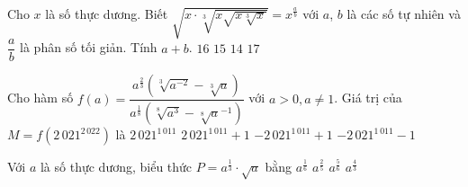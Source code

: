 \begin{ex}%
	Cho $x$ là số thực dương. Biết $\sqrt{x\cdot \sqrt[3]{x\sqrt{x\sqrt[3]{x}}}} = x^{\tfrac{a}{b}}$ với $a$, $b$ là các số tự nhiên và $\dfrac{a}{b}$  là phân số tối giản. Tính $a+b$.
	 \choice
		{\True  $16$}
		{$15$} 
		{$14$} 
		 {$17$}
\end{ex}

\begin{ex}%
	Cho  hàm số $f\left(a\right)=\dfrac{a^{\tfrac{2}{3}}\left(\sqrt[3]{a^{-2}}-\sqrt[3]{a}\right)}{a^{\tfrac{1}{8}}\left(\sqrt[8]{a^{3}}-\sqrt[8]a^{-1}\right)}$ với $a>0,a\ne 1$. Giá trị của $M=f\left(2\,021^{2\,022}\right)$ là
	 \choice
		{$2\,021^{1\,011}$} 
		{$2\,021^{1\,011}+1$} 
		 {$-2\,021^{1\,011}+1$}
		 {\True $-2\,021^{1\,011}-1$}
\end{ex}

\begin{ex}%
	Với $a$ là số thực dương,  biểu thức $P=a^{\tfrac{1}{3}}\cdot \sqrt{a}$ bằng
	 \choice
		{$a^{\tfrac{1}{6}}$} 
		 {$a^{\tfrac{2}{5}}$}
		{\True $a^{\tfrac{5}{6}}$} 
		{$a^{\tfrac{4}{3}}$} 
\end{ex}

